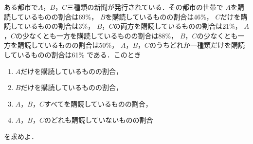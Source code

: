 \documentclass[../../main.tex]{subfiles}
\begin{document}
ある都市で$A$，$B$，$C$三種類の新聞が発行されている．その都市の世帯で
$A$を購読しているものの割合は69\%，
$B$を購読しているものの割合は46\%，
$C$だけを購読しているものの割合は3\%，
$B$，$C$の両方を購読しているものの割合は21\%，
$A$，$C$の少なくとも一方を購読しているものの割合は88\%，
$B$，$C$の少なくとも一方を購読しているものの割合は50\%，
$A$，$B$，$C$のうちどれか一種類だけを購読しているものの割合は61\%
である．このとき
\begin{enumerate}
  \item $A$だけを購読しているものの割合，
  \item $B$だけを購読しているものの割合，
  \item $A$，$B$，$C$すべてを購読しているものの割合，
  \item $A$，$B$，$C$のどれも購読していないものの割合
\end{enumerate}
を求めよ．
\end{document}
